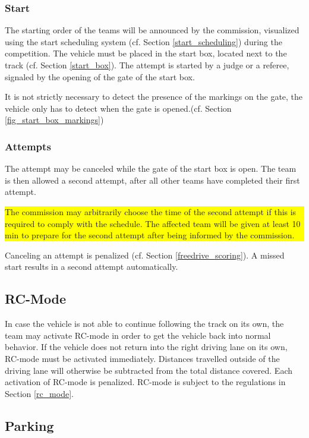 \documentclass[a4paper]{report}
\newlength\colorboxwidth
\begin{document}
\subsubsection{Start}

The starting order of the teams will be announced by the commission, visualized
using the start scheduling system (cf. Section \ref{start_scheduling}) during
the competition. The vehicle must be placed in the start box, located next to
the track (cf. Section \ref{start_box}). The attempt is started by a judge or a
referee, signaled by the opening of the gate of the start box.

It is not strictly necessary to detect the presence of the markings on the
gate, the vehicle only has to detect when the gate is opened.(cf. Section
\ref{fig_start_box_markings})

\subsubsection{Attempts}

The attempt may be canceled while the gate of the start box is open. The team
is then allowed a second attempt, after all other teams have completed their
first attempt.\\ \colorbox{yellow}{\parbox{\colorboxwidth}{The commission may
		arbitrarily choose the time of the second attempt if this is required to comply
		with the schedule. The affected team will be given at least 10 min to prepare
		for the second attempt after being informed by the commission.}} Canceling an
attempt is penalized (cf. Section \ref{freedrive_scoring}). A missed start
results in a second attempt automatically.

\subsection{RC-Mode}

In case the vehicle is not able to continue following the track on its own, the
team may activate RC-mode in order to get the vehicle back into normal
behavior. If the vehicle does not return into the right driving lane on its
own, RC-mode must be activated immediately. Distances travelled outside of the
driving lane will otherwise be subtracted from the total distance covered. Each
activation of RC-mode is penalized. RC-mode is subject to the regulations in
Section \ref{rc_mode}.

\subsection{Parking}
\end{document}
